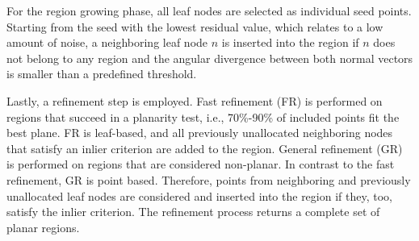 \documentclass[main.tex]{subfiles}
\begin{document}
For the region growing phase, all leaf nodes are selected as individual seed points. Starting from the seed with the lowest residual value, which relates to a low amount of noise,
a neighboring leaf node $n$ is inserted into the region if $n$ does not belong to any region and the angular divergence between both normal vectors is smaller than
a predefined threshold.

Lastly, a refinement step is employed.
Fast refinement (FR) is performed on regions that succeed in a planarity test, i.e., 70\%-90\% of included points fit the best plane. FR is leaf-based, and all previously unallocated neighboring nodes that satisfy an inlier criterion are added to the region.
General refinement (GR) is performed on regions that are considered non-planar. In contrast to the fast refinement, GR is point based. Therefore,
points from neighboring and previously unallocated leaf nodes are considered and inserted into the region if they, too, satisfy the inlier criterion.
The refinement process returns a complete set of planar regions.
\end{document}
